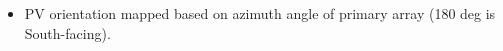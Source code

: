 \begin{itemize}
\item PV orientation mapped based on azimuth angle of primary array (180 deg is South-facing).
\end{itemize}

